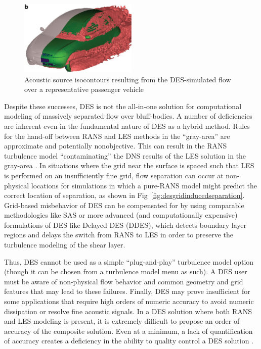 \documentclass[journal]{new-aiaa}
\begin{document}
\begin{figure}[H]
\begin{center}
\includegraphics[width=0.5\textwidth]{Images/logan/spalart2009detachededdy_carDES.pdf}
\caption{ Acoustic source isocontours resulting from the DES-simulated flow over a representative passenger vehicle \cite{mendonca2002towards} }
\label{fig:cardes}
\end{center}
\end{figure}




Despite these successes, DES is not the all-in-one solution for computational modeling of massively separated flow over bluff-bodies. A number of deficiencies are inherent even in the fundamental nature of DES as a hybrid method. Rules for the hand-off between RANS and LES methods in the ``gray-area'' are approximate and potentially nonobjective. This can result in the RANS turbulence model ``contaminating'' the DNS results of the LES solution in the gray-area \cite{spalart2009detachededdy}. In situations where the grid near the surface is spaced such that LES is performed on an insufficiently fine grid, flow separation can occur at non-physical locations for simulations in which a pure-RANS model might predict the correct location of separation, as shown in Fig~\ref{fig:desgridinducedseparation}. Grid-based misbehavior of DES can be compensated for by using comparable methodologies like SAS or more advanced (and computationally expensive) formulations of DES like Delayed DES (DDES), which detects boundary layer regions and delays the switch from RANS to LES in order to preserve the turbulence modeling of the shear layer.

Thus, DES cannot be used as a simple ``plug-and-play'' turbulence model option (though it can be chosen from a turbulence model menu as such). A DES user must be aware of non-physical flow behavior and common geometry and grid features that may lead to these failures. Finally, DES may prove insufficient for some applications that require high orders of numeric accuracy to avoid numeric dissipation or resolve fine acoustic signals. In a DES solution where both RANS and LES modeling is present, it is extremely difficult to propose an order of accuracy of the composite solution. Even at a minimum, a lack of quantification of accuracy creates a deficiency in the ability to quality control a DES solution \cite{spalart2009detachededdy}.
\end{document}
